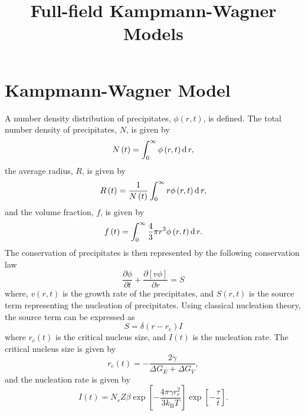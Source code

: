 \documentclass[11pt]{scrartcl}
\newcommand{\kB}{\ensuremath{k_\text{B}}}
\newcommand{\inc}[1]{\ensuremath{\text d\,{#1}}}
\newcommand{\partialder}[2]{\ensuremath{\frac{\partial{#1}}{\partial{#2}}}}
\begin{document}
\title{Full-field Kampmann-Wagner Models}
\maketitle


\section{Kampmann-Wagner Model}

A number density distribution of precipitates, $\phi\left(r,t\right)$, is defined. 
The total number density of precipitates, $N$, is given by
%
\begin{equation}
\label{eq: totaldensity}
N\left(t\right) = \int_{0}^{\infty} \phi\left(r,t\right) \inc{r},
\end{equation}
%
the average radius, $R$, is given by
%
\begin{equation}
\label{eq: avgradius}
R\left(t\right) = \frac{1}{N\left(t\right)}\int_{0}^{\infty} r \phi\left(r,t\right) \inc{r},
\end{equation}
%
and the volume fraction, $f$, is given by
%
\begin{equation}
\label{eq: volfrac}
f\left(t\right) =\int_{0}^{\infty} \frac{4}{3} \pi r^3 \phi\left(r,t\right) \inc{r}.
\end{equation}
%
The conservation of precipitates is then represented by the following conservation law
%
\begin{equation}
\label{eq: conservation}
\partialder{\phi}{t}+ \partialder{\left[v \phi\right]}{r} = S
\end{equation}
%
where, $v\left(r,t\right)$ is the growth rate of the precipitates, and $S\left(r,t\right)$ is the source term representing the nucleation of precipitates.
Using classical nucleation theory, the source term can be expressed as
%
\begin{equation}
\label{eq: source}
S = \delta\left(r - r_c\right) I
\end{equation}
%
where $r_c\left(t\right)$ is the critical nucleus size, and $I\left(t\right)$ is the nucleation rate.
The critical nucleus size is given by
%
\begin{equation}
\label{eq: critradius}
r_c\left(t\right) = - \frac{2\gamma}{\Delta G_E + \Delta G_V},
\end{equation}
%
and the nucleation rate is given by
%
\begin{equation}
\label{eq: nucleation}
I\left(t\right) = N_s Z \beta \exp{\left[-\frac{4\pi\gamma r_c^2}{3\kB T}\right]} \exp{\left[-\frac{\tau}{t}\right]}.
\end{equation}
\end{document}
